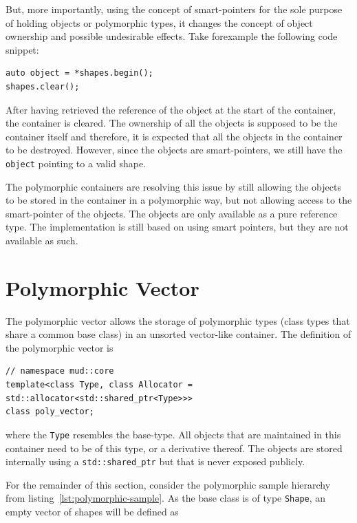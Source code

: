 \documentclass[10pt,a4paper,openany]{mudbook}
\begin{document}
But, more importantly, using the concept of smart-pointers for the sole purpose
of holding objects or polymorphic types, it changes the concept of object
ownership and possible undesirable effects. Take forexample the following code
snippet:

\noindent
\begin{minipage}{\linewidth}
\begin{lstlisting}[style=snippet]
auto object = *shapes.begin();
shapes.clear();
\end{lstlisting}
\end{minipage}

After having retrieved the reference of the object at the start of the
container, the container is cleared. The ownership of all the objects is
supposed to be the container itself and therefore, it is expected that all
the objects in the container to be destroyed. However, since the objects
are smart-pointers, we still have the \texttt{object} pointing to a valid
shape.

The polymorphic containers are resolving this issue by still allowing the
objects to be stored in the container in a polymorphic way, but not allowing
access to the smart-pointer of the objects. The objects are only available
as a pure reference type. The implementation is still based on using smart
pointers, but they are not available as such.

\section{Polymorphic Vector}
\label{sct:poly_vector}

The polymorphic vector allows the storage of polymorphic types (class types
that share a common base class) in an unsorted vector-like container. The
definition of the polymorphic vector is

\begin{lstlisting}[style=definition]
// namespace mud::core
template<class Type, class Allocator = std::allocator<std::shared_ptr<Type>>>
class poly_vector;
\end{lstlisting}

where the \texttt{Type} resembles the base-type. All objects that are
maintained in this container need to be of this type, or a derivative thereof.
The objects are stored internally using a \texttt{std::shared\_ptr} but that
is never exposed publicly.

For the remainder of this section, consider the polymorphic sample hierarchy
from listing~\ref{lst:polymorphic-sample}. As the base class is of type
\texttt{Shape}, an empty vector of shapes will be defined as
\end{document}
